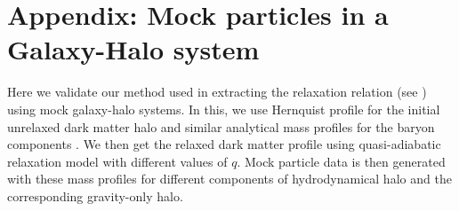 \section{Appendix: Mock particles in a Galaxy-Halo system}
\label{appen:Mock-ch:z0main}
Here we validate our method used in extracting the relaxation relation (see ) using mock galaxy-halo systems.
In this, we use Hernquist profile for the initial unrelaxed dark matter halo and similar analytical mass profiles for the baryon components \citep[see appendix of][]{2021MNRAS.507..632P}. We then get the relaxed dark matter profile using quasi-adiabatic relaxation model with different values of $q$. Mock particle data is then generated with these mass profiles for different components of hydrodynamical halo and the corresponding gravity-only halo.

